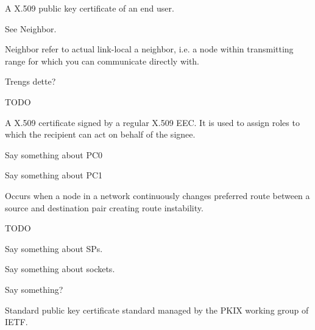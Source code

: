 \begin{acronym}
	A X.509 public key certificate of an end user.

	See Neighbor.


	Neighbor refer to actual link-local a neighbor, i.e. a node within
	transmitting range for which you can communicate directly with.

	Trengs dette?




	TODO

	A X.509 certificate signed by a regular X.509 EEC. It is used to assign roles
	to which the recipient can act on behalf of the signee.

	Say something about PC0
	
	Say something about PC1
	
	


	Occurs when a node in a network continuously changes preferred route between a
	source and destination pair creating route instability.


	TODO

	Say something about SPs.


	Say something about sockets.

	Say something?

	Standard public key certificate standard managed by the PKIX working group of
	IETF.

\end{acronym}
